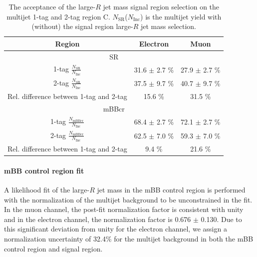 \begin{table}[!htbp]
\begin{center}
\begin{tabular}{c|c|c}
\hline
Region    & Electron          & Muon      \\
\hline
\multicolumn{3}{c}{SR} \\
\hline
1-tag $\frac{N_\text{SR}}{N_\text{Inc}}$ &  31.6 $\pm$ 2.7 \% & 27.9 $\pm$ 2.7 \% \\
2-tag $\frac{N_\text{SR}}{N_\text{Inc}}$ &  37.5 $\pm$ 9.7 \% & 40.7 $\pm$ 9.7 \% \\
\hline \hline
Rel. difference between 1-tag and 2-tag & 15.6 \% & 31.5 \% \\
\hline
\multicolumn{3}{c}{mBBcr} \\
\hline
1-tag $\frac{N_\text{mBBcr}}{N_\text{Inc}}$ &  68.4 $\pm$ 2.7  \% & 72.1 $\pm$ 2.7 \% \\
2-tag $\frac{N_\text{mBBcr}}{N_\text{Inc}}$ &  62.5 $\pm$ 7.0  \% & 59.3 $\pm$ 7.0 \% \\
\hline \hline
Rel. difference between 1-tag and 2-tag &  9.4 \% &   21.6 \% \\
\end{tabular}
\end{center}
\caption[The acceptance of the large-$R$ jet mass signal region selection on the multijet
1-tag and 2-tag region C]{The acceptance of the large-$R$ jet mass signal region selection on the multijet
1-tag and 2-tag region C. $N_\text{SR}$($N_\text{Inc}$) is the multijet yield
with (without) the signal region large-$R$ jet mass selection.}
\label{tab:boosted_syst_qcd_norm_mBBAcc}
\end{table}
 
\paragraph{mBB control region fit} 
 A likelihood fit of the large-$R$ jet mass in the mBB control region
is performed with the normalization of the multijet background to be unconstrained in the fit.
In the muon channel,
the post-fit normalization factor is consistent with unity and in the electron channel,
the normalization factor is 0.676 $\pm$ 0.130. Due to this significant deviation from unity for the electron channel,
we assign a normalization uncertainty of 32.4\% for the multijet background in both the mBB control
region and signal region.
 
